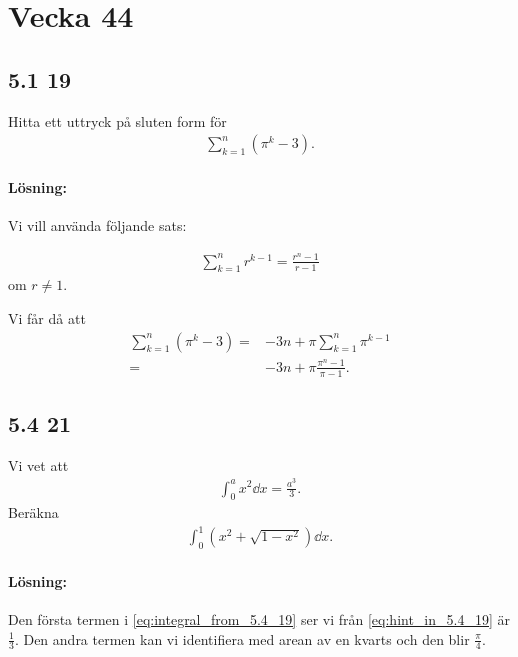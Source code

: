 \section{Vecka 44}%
\label{sec:vecka_44}

\subsection{5.1 19}%
\label{sub:5_1_19}

Hitta ett uttryck på sluten form för
\begin{align}
	\sum_{k = 1}^n (\pi^k - 3).
\end{align}

\paragraph{Lösning:}%
\label{par:losning_}

Vi vill använda följande sats:
\begin{theorem}[5.1 (d) i Adams]
	\begin{align}
		\sum_{k = 1}^n r^{k - 1} = \frac{r^n - 1}{r - 1}
	\end{align}
	om $r \neq 1$.
\end{theorem}
Vi får då att
\begin{align*}
	\sum_{k = 1}^n (\pi^k - 3) ={}& -3 n + \pi \sum_{k = 1}^n \pi^{k - 1}\\
	={}& -3 n + \pi \frac{\pi^n - 1}{\pi - 1}.
\end{align*}


\subsection{5.4 21}%
\label{sub:5_4_21}

Vi vet att
\begin{align}\label{eq:hint_in_5.4_19}
	\int_0^a x^2 \dd{x} = \frac{a^3}{3}.
\end{align}
Beräkna
\begin{align}\label{eq:integral_from_5.4_19}
	\int_0^1 (x^2 + \sqrt{1 - x^2}) \dd{x}.
\end{align}

\paragraph{Lösning:}

Den första termen i \cref{eq:integral_from_5.4_19} ser vi från \cref{eq:hint_in_5.4_19} är $\frac{1}{3}$.
Den andra termen kan vi identifiera med arean av en kvarts och den blir $\frac{\pi}{4}$.


